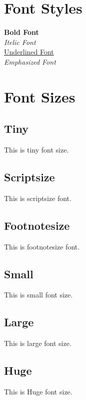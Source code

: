 \documentclass{article}
\begin{document}
    \section{Font Styles}
    \textbf{Bold Font}\\
    \textit{Itelic Font}\\
    \underline{Underlined Font}\\
    \emph{Emphasized Font}

    \section{Font Sizes}
    \subsection{Tiny}
    \tiny
    This is tiny font size.

    \subsection{Scriptsize}
    \scriptsize
    This is scriptsize font.

    \subsection{Footnotesize}
    \footnotesize
    This is footnotesize font.

    \subsection{Small}
    \small
    This is small font size.

    \subsection{Large}
    \large
    This is large font size.

    \subsection{Huge}
    \huge
    This is Huge font size.
\end{document}
